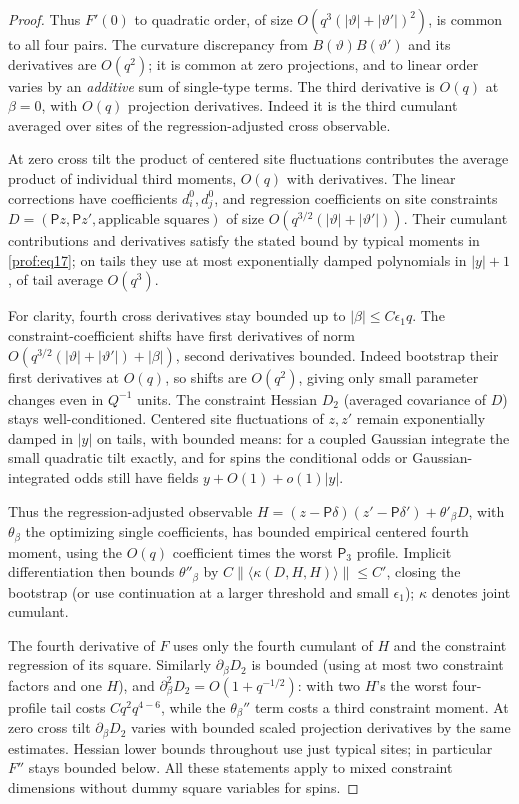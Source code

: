 \begin{proof}
Thus \(F'(0)\) to quadratic order, of size \(O(q^3(|\vartheta|+|\vartheta'|)^2)\), is common to all four pairs. The curvature discrepancy from \(B(\vartheta)B(\vartheta')\) and its derivatives are \(O(q^2)\); it is common at zero projections, and to linear order varies by an \emph{additive} sum of single-type terms. The third derivative is \(O(q)\) at \(\beta=0\), with \(O(q)\) projection derivatives. Indeed it is the third cumulant averaged over sites of the regression-adjusted cross observable.

At zero cross tilt the product of centered site fluctuations contributes the average product of individual third moments, \(O(q)\) with derivatives. The linear corrections have coefficients \(d_i^0,d_j^0\), and regression coefficients on site constraints \(D=(\mathsf P z,\mathsf P z',\text{applicable squares})\) of size \(O(q^{3/2}(|\vartheta|+|\vartheta'|))\). Their cumulant contributions and derivatives satisfy the stated bound by typical moments in \eqref{prof:eq17}; on tails they use at most exponentially damped polynomials in \(|y|+1\), of tail average \(O(q^3)\).

For clarity, fourth cross derivatives stay bounded up to \(|\beta|\le C\epsilon_1 q\). The constraint-coefficient shifts have first derivatives of norm \(O(q^{3/2}(|\vartheta|+|\vartheta'|)+|\beta|)\), second derivatives bounded. Indeed bootstrap their first derivatives at \(O(q)\), so shifts are \(O(q^2)\), giving only small parameter changes even in \(Q^{-1}\) units. The constraint Hessian \(D_2\) (averaged covariance of \(D\)) stays well-conditioned. Centered site fluctuations of \(z,z'\) remain exponentially damped in \(|y|\) on tails, with bounded means: for a coupled Gaussian integrate the small quadratic tilt exactly, and for spins the conditional odds or Gaussian-integrated odds still have fields \(y+O(1)+o(1)|y|\).

Thus the regression-adjusted observable \(H=(z-\mathsf P\delta)(z'-\mathsf P\delta')+\theta'_\beta D\), with \(\theta_\beta\) the optimizing single coefficients, has bounded empirical centered fourth moment, using the \(O(q)\) coefficient times the worst \(\mathsf P_3\) profile. Implicit differentiation then bounds \(\theta''_\beta\) by \(C\|\langle\kappa(D,H,H)\rangle\|\le C'\), closing the bootstrap (or use continuation at a larger threshold and small \(\epsilon_1\)); \(\kappa\) denotes joint cumulant.

The fourth derivative of \(F\) uses only the fourth cumulant of \(H\) and the constraint regression of its square. Similarly \(\partial_\beta D_2\) is bounded (using at most two constraint factors and one \(H\)), and \(\partial_\beta^2 D_2=O(1+q^{-1/2})\): with two \(H\)'s the worst four-profile tail costs \(Cq^2 q^{4-6}\), while the \(\theta_\beta''\) term costs a third constraint moment. At zero cross tilt \(\partial_\beta D_2\) varies with bounded scaled projection derivatives by the same estimates. Hessian lower bounds throughout use just typical sites; in particular \(F''\) stays bounded below. All these statements apply to mixed constraint dimensions without dummy square variables for spins.


\end{proof}
